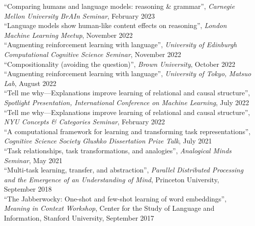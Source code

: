 \documentclass[margin]{res}
\begin{document}
\begin{resume}
{{``Comparing humans and language models: reasoning \& grammar'',} \textit{Carnegie Mellon University BrAIn Seminar}, February 2023\\[3pt] 
{``Language models show human-like content effects on reasoning'',} \textit{London Machine Learning Meetup}, November 2022\\[3pt] 
{``Augmenting reinforcement learning with language'',} \textit{University of Edinburgh Computational Cognitive Science Seminar}, November 2022\\[3pt] 
{``Compositionality (avoiding the question)'',} \textit{Brown University}, October 2022\\[3pt] 
{``Augmenting reinforcement learning with language'',} \textit{University of Tokyo, Matsuo Lab}, August 2022\\[3pt] 
{``Tell me why---Explanations improve learning of relational and causal structure'',} \textit{Spotlight Presentation, International Conference on Machine Learning}, July 2022\\[3pt] 
{``Tell me why---Explanations improve learning of relational and causal structure'',} \textit{NYU Concepts \& Categories Seminar}, February 2022\\[3pt] 
{``A computational framework for learning and transforming task representations'',} \textit{Cognitive Science Society Glushko Dissertation Prize Talk}, July 2021\\[3pt] 
{``Task relationships, task transformations, and analogies'',} \textit{Analogical Minds Seminar}, May 2021\\[3pt] 
{``Multi-task learning, transfer, and abstraction'',} \textit{Parallel Distributed Processing and the Emergence of an Understanding of Mind}, Princeton University, September 2018\\[3pt] 
{``The Jabberwocky: One-shot and few-shot learning of word embeddings'',} \textit{Meaning in Context Workshop}, Center for the Study of Language and Information,  Stanford University, September 2017 
 
}
\end{resume}
\end{document}
